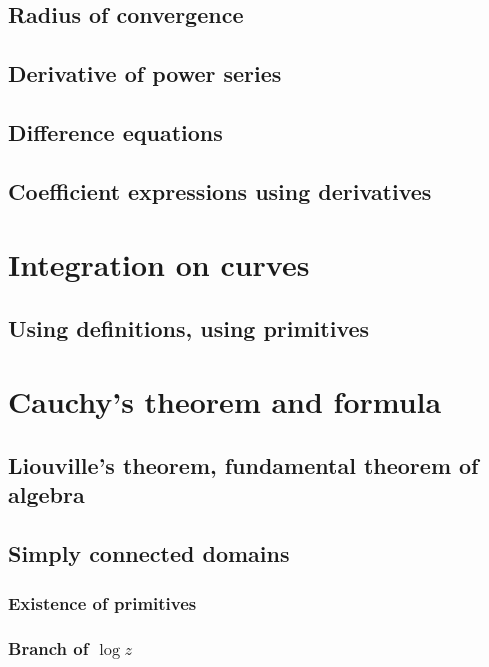 \subsection{Radius of convergence}

\subsection{Derivative of power series}

\subsection{Difference equations}

\subsection{Coefficient expressions using derivatives}



\section{Integration on curves}

\subsection{Using definitions, using primitives}



\section{Cauchy's theorem and formula}

\subsection{Liouville's theorem, fundamental theorem of algebra}

\subsection{Simply connected domains}
  \subsubsection{Existence of primitives}
  \subsubsection{Branch of $\log z$}
